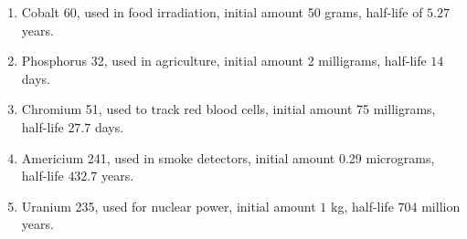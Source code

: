 \documentclass{ximera}
\begin{document}
\begin{enumerate}
\setcounter{enumi}{\value{HW}}

\item  Cobalt 60, used in food irradiation, initial amount 50 grams, half-life of $5.27$ years.  \label{radioactivefirst}

\item  Phosphorus 32, used in agriculture, initial amount 2 milligrams, half-life $14$ days.

\item  Chromium 51, used to track red blood cells, initial amount 75 milligrams, half-life  $27.7$ days.

\item  Americium 241, used in smoke detectors, initial amount 0.29 micrograms, half-life $432.7$ years.

\item  Uranium 235, used for nuclear power, initial amount $1$ kg, half-life  $704$ million years. \label{radioactivelast}

\setcounter{HW}{\value{enumi}}
\end{enumerate}
\end{document}
